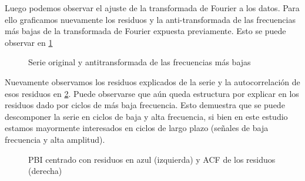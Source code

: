 \documentclass[a4paper]{article}
\begin{document}
Luego podemos observar el ajuste de la transformada de Fourier a los datos. Para ello graficamos nuevamente los residuos y la anti-transformada de las frecuencias más bajas de la transformada de Fourier expuesta previamente. Esto se puede observar en \ref{fig:PBI_cntr_antifft}

\begin{figure}[H]
	\centering
	\caption{Serie original y antitransformada de las frecuencias más bajas} 
	\label{fig:PBI_cntr_antifft}
\end{figure}

Nuevamente observamos los residuos explicados de la serie y la autocorrelación de esos residuos en \ref{fig:PBI_fft_resid}. Puede observarse que aún queda estructura por explicar en los residuos dado por ciclos de más baja frecuencia. Esto demuestra que se puede descomponer la serie en ciclos de baja y alta frecuencia, si bien en este estudio estamos mayormente interesados en ciclos de largo plazo (señales de baja frecuencia y alta amplitud).

\begin{figure}[H]
	\centering
	\caption{PBI centrado con residuos en azul (izquierda) y ACF de los residuos (derecha)}
	\label{fig:PBI_fft_resid}
\end{figure}
\end{document}
